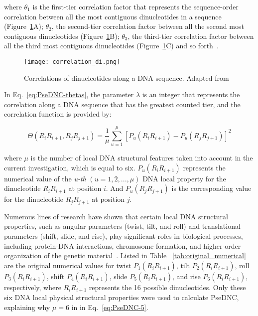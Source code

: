 where $\theta_{1}$ is the first-tier correlation factor that represents the sequence-order correlation between all the most contiguous dinucleotides in a sequence (Figure~\ref{fig:psednc_correlation}A); $\theta_{2}$, the second-tier correlation factor between all the second most contiguous dinucleotides (Figure~\ref{fig:psednc_correlation}B); $\theta_{3}$, the third-tier correlation factor between all the third most contiguous dinucleotides (Figure~\ref{fig:psednc_correlation}C) and so forth~\cite{Chen2013IRSpot-PseDNC:Composition}.

\begin{figure}[htbp]
    \centering
    \texttt{[image: correlation\_di.png]}
    \caption{Correlations of dinucleotides along a DNA sequence. Adapted from~\cite{Chen2013IRSpot-PseDNC:Composition}}
    \label{fig:psednc_correlation}
\end{figure}


In Eq.~\ref{eq:PseDNC-thetas}, the parameter $\lambda$ is an integer that represents the correlation along a \gls{DNA} sequence that has the greatest counted tier, and the correlation function is provided by:

\begin{equation}\label{eq:PseDNC-5}
    \Theta(R_{i}R_{i+1}, R_{j}R_{j+1}) = \frac{1}{\mu}\sum_{u=1}^{\mu}[P_{u} (R_{i}R_{i+1}) - P_{u}(R_{j}R_{j+1})]^{2}
\end{equation}

where $\mu$ is the number of local \gls{DNA} structural features taken into account in the current investigation, which is equal to six. $P_{u} (R_{i}R_{i+1})$ represents the numerical value of the \textit{u-th} $(u = 1,2,...,\mu)$ \gls{DNA} local property for the dinucleotide $R_{i}R_{i+1}$ at position $i$. And $P_{u}(R_{j}R_{j+1})$ is the corresponding value for the dinucleotide $R_{j}R_{j+1}$ at position $j$.

Numerous lines of research have shown that certain local \gls{DNA} structural properties, such as angular parameters (twist, tilt, and roll) and translational parameters (shift, slide, and rise), play significant roles in biological processes, including protein-\gls{DNA} interactions, chromosome formation, and higher-order organization of the genetic material~\cite{Goni2008DNAlive:Scale,Goni2007DeterminingCalculations}. Listed in Table
~\ref{tab:original_numerical} are the original numerical values for twist $P_{1}(R_{i}R_{i+1})$⁠, tilt $P_{2}(R_{i}R_{i+1})$⁠, roll $P_{3}(R_{i}R_{i+1})$⁠, shift $P_{4}(R_{i}R_{i+1})$⁠, slide $P_{5}(R_{i}R_{i+1})$⁠, and rise $P_{6}(R_{i}R_{i+1})$⁠, respectively, where $R_{i}R_{i+1}$ represents the 16 possible dinucleotides. Only these six \gls{DNA} local physical structural properties were used to calculate \gls{PseDNC}, explaining why $\mu = 6$ in in Eq.~\ref{eq:PseDNC-5}.

